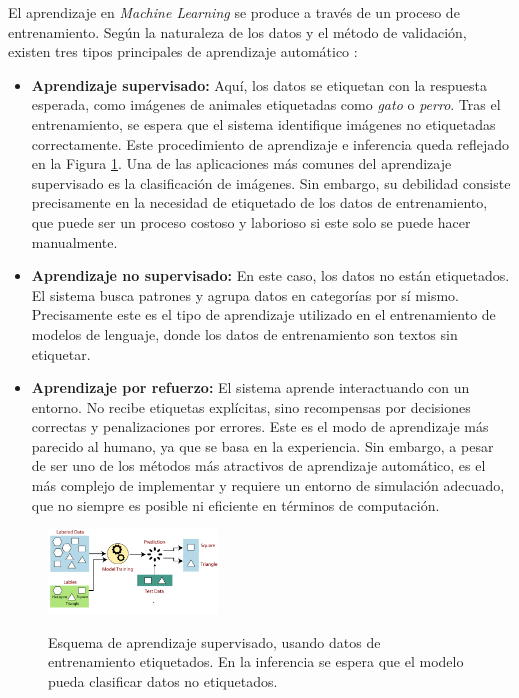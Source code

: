 El aprendizaje en \textit{Machine Learning} se produce a través de un proceso de entrenamiento. Según la naturaleza de los datos y el método de validación, existen tres tipos principales de aprendizaje automático \citep[p. ~38]{torresivinalsPythonDeepLearning2020}:

\begin{itemize}
    \item \textbf{Aprendizaje supervisado:} Aquí, los datos se etiquetan con la respuesta esperada, como imágenes de animales etiquetadas como \textit{gato} o \textit{perro}. Tras el entrenamiento, se espera que el sistema identifique imágenes no etiquetadas correctamente. Este procedimiento de aprendizaje e inferencia queda reflejado en la Figura \ref{fig:labeled_data_training}. Una de las aplicaciones más comunes del aprendizaje supervisado es la clasificación de imágenes. Sin embargo, su debilidad consiste precisamente en la necesidad de etiquetado de los datos de entrenamiento, que puede ser un proceso costoso y laborioso si este solo se puede hacer manualmente.
    
    \item \textbf{Aprendizaje no supervisado:} En este caso, los datos no están etiquetados. El sistema busca patrones y agrupa datos en categorías por sí mismo. Precisamente este es el tipo de aprendizaje utilizado en el entrenamiento de modelos de lenguaje, donde los datos de entrenamiento son textos sin etiquetar.
    
    \item \textbf{Aprendizaje por refuerzo:} El sistema aprende interactuando con un entorno. No recibe etiquetas explícitas, sino recompensas por decisiones correctas y penalizaciones por errores. Este es el modo de aprendizaje más parecido al humano, ya que se basa en la experiencia. Sin embargo, a pesar de ser uno de los métodos más atractivos de aprendizaje automático, es el más complejo de implementar y requiere un entorno de simulación adecuado, que no siempre es posible ni eficiente en términos de computación.
\end{itemize}

\begin{figure}[h]
    \caption[Esquema de aprendizaje supervisado]{Esquema de aprendizaje supervisado, usando datos de entrenamiento etiquetados. En la inferencia se espera que el modelo pueda clasificar datos no etiquetados.}
    \centering
    \includegraphics[width=0.4\textwidth]{./figuras/labeled_data_training.png}
    \label{fig:labeled_data_training}
\end{figure}


